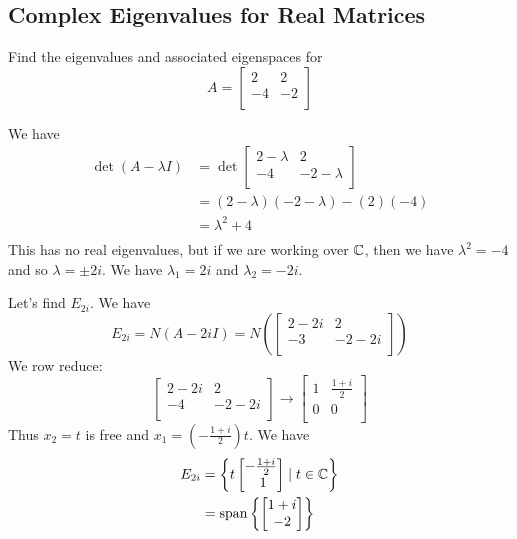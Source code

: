 \documentclass{article}
\DeclareMathOperator{\spn}{span}
\begin{document}
\subsection{Complex Eigenvalues for Real Matrices}
\begin{example}
  Find the eigenvalues and associated eigenspaces for \[
    A =
    \begin{bmatrix}
      2  & 2  \\
      -4 & -2 \\
    \end{bmatrix}
  \]

  We have
  \begin{align*}
    \det (A - \lambda I) & = \det
    \begin{bmatrix}
      2 - \lambda & 2          \\
      -4          & -2-\lambda \\
    \end{bmatrix}                                   \\
                         & = (2-\lambda)(-2-\lambda) - (2)(-4) \\
                         & = \lambda^2 + 4                     \\
  \end{align*}
  This has no real eigenvalues, but if we are working over $\mathbb{C}$, then we have $\lambda^2 = -4$ and so $\lambda = \pm 2i$.
  We have $\lambda_1 = 2i$ and $\lambda_2 = -2i$.

  Let's find $E_{2i}$. We have \[
    E_{2i} = N(A - 2iI) = N \left(
    \begin{bmatrix}
        2 -2i & 2      \\
        -3    & -2 -2i \\
      \end{bmatrix}\right)
  \]
  We row reduce: \[
    \begin{bmatrix}
      2 - 2i & 2     \\
      -4     & -2-2i \\
    \end{bmatrix} \to
    \begin{bmatrix}
      1 & \frac{1 + i}{2} \\
      0 & 0               \\
    \end{bmatrix}
  \]
  Thus $x_2 = t$ is free and $x_1 = \left(-\frac{1+i}{2}\right)t$. We have
  \begin{align*}
    E_{2i} & = \left\{ t
    \begin{bmatrix}
      -\frac{1 + i}{2} \\\
      1                \\
    \end{bmatrix}\mid t \in \C \right\} \\
           & = \spn \left\{
    \begin{bmatrix}
      1 + i \\
      -2    \\
    \end{bmatrix}\right\}
  \end{align*}
\end{example}
\end{document}
